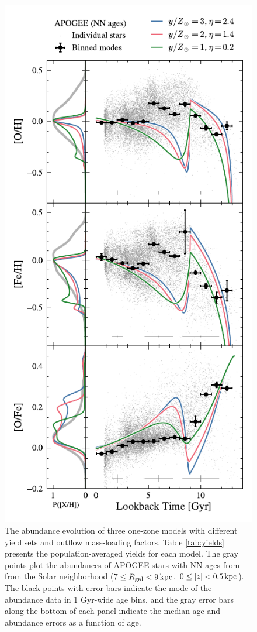 \documentclass[twocolumn,twocolappendix,linenumbers]{aastex631}
\newcommand{\kpc}{\,{\rm kpc}}
\begin{document}
\begin{figure}
    \centering
    \includegraphics[width=\linewidth]{figures/yield_outflow.pdf}
    \caption{The abundance evolution of three one-zone models with different yield sets and outflow mass-loading factors. Table \ref{tab:yields} presents the population-averaged yields for each model. The gray points plot the abundances of APOGEE stars with NN ages from \citet{leung_variational_2023} from the Solar neighborhood ($7\leq R_{\rm gal}<9\kpc$, $0\leq|z|<0.5\kpc$). The black points with error bars indicate the mode of the abundance data in 1 Gyr-wide age bins, and the gray error bars along the bottom of each panel indicate the median age and abundance errors as a function of age.}
    \label{fig:yield-outflow}
\end{figure}
\end{document}
